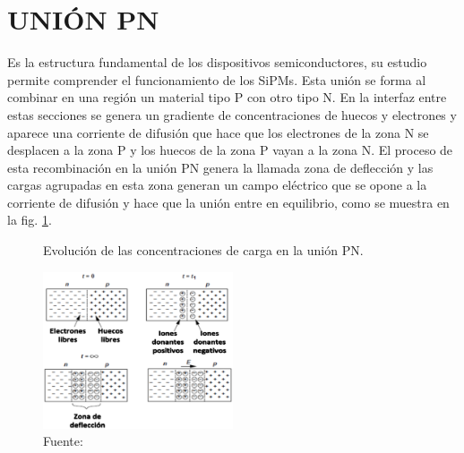 \section{UNIÓN PN}
Es la estructura fundamental de los dispositivos semiconductores, su estudio permite comprender el funcionamiento de los SiPMs. Esta unión se forma al combinar en una región un material tipo P con otro tipo N. En la interfaz entre estas secciones se genera un gradiente de concentraciones de huecos y electrones y aparece una corriente de difusión que hace que los electrones de la zona N se desplacen a la zona P y los huecos de la zona P vayan a la zona N. El proceso de esta recombinación en la unión PN genera la llamada zona de deflección y las cargas agrupadas en esta zona generan un campo eléctrico que se opone a la corriente de difusión y hace que la unión entre en equilibrio, como se muestra en la fig. \ref{fig:PNjuntion}.
\begin{figure}[h!]
\begin{centering}
  \caption{Evolución de las concentraciones de carga en la unión PN.}
  \includegraphics[width=0.5\textwidth]{Images/UnionPN.eps}
  \caption*{Fuente: \citep{Book_razavi}}
  \label{fig:PNjuntion}
  \par\end{centering}
\end{figure}
